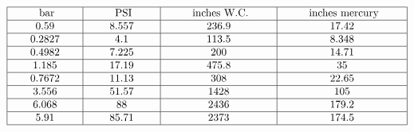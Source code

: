 $$\vbox{\offinterlineskip
\halign{\strut
\vrule \quad\hfil # \ \hfil & 
\vrule \quad\hfil # \ \hfil & 
\vrule \quad\hfil # \ \hfil & 
\vrule \quad\hfil # \ \hfil \vrule \cr
\noalign{\hrule}
%
\hskip 20pt bar \hskip 20pt & \hskip 20pt PSI \hskip 20pt & \hskip 20pt inches W.C. \hskip 20pt & \hskip 20pt inches mercury \hskip 20pt \cr
%
\noalign{\hrule}
%
0.59 & 8.557 & 236.9 & 17.42 \cr
%
\noalign{\hrule}
%
0.2827 & 4.1 & 113.5 & 8.348 \cr
%
\noalign{\hrule}
%
0.4982 & 7.225 & 200 & 14.71 \cr
%
\noalign{\hrule}
%
1.185 & 17.19 & 475.8 & 35 \cr
%
\noalign{\hrule}
%
0.7672 & 11.13 & 308 & 22.65 \cr
%
\noalign{\hrule}
%
3.556 & 51.57 & 1428 & 105 \cr
%
\noalign{\hrule}
%
6.068 & 88 & 2436 & 179.2 \cr
%
\noalign{\hrule}
%
5.91 & 85.71 & 2373 & 174.5 \cr
%
\noalign{\hrule}
} %
}$$ %











